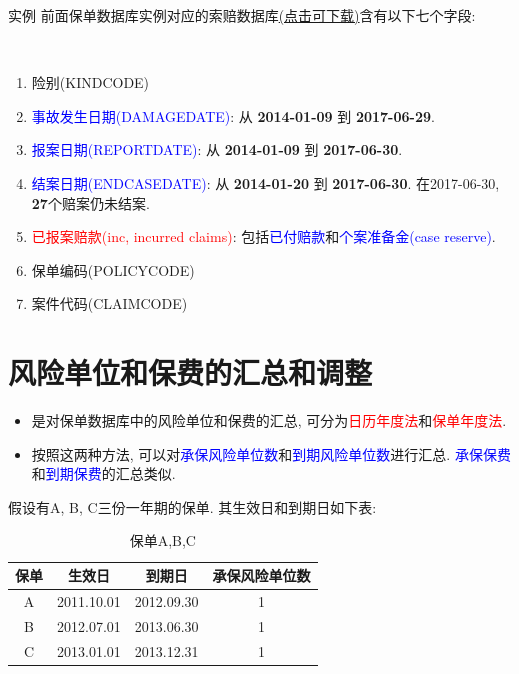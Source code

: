 \documentclass[professionalfont]{beamer}
\newcommand{\red}[1]{\textcolor{red}{#1}}
\newcommand{\green}[1]{\textbf{#1}}
\newcommand{\blue}[1]{\textcolor{blue}{#1}}
\begin{document}
\begin{frame}{实例}
前面保单数据库实例对应的索赔数据库\href{https://www.jianguoyun.com/p/Df-ykJgQyKLGBhjLsUU}{(点击可下载)}含有以下七个字段:
		
		~
		
		\begin{enumerate}
			\item 险别(KINDCODE)
			\item \blue{事故发生日期(DAMAGEDATE)}: 从 \green{2014-01-09} 到 \green{2017-06-29}.
			\item \blue{报案日期(REPORTDATE)}: 从 \green{2014-01-09} 到 \green{2017-06-30}.
			\item \blue{结案日期(ENDCASEDATE)}: 从 \green{2014-01-20} 到 \green{2017-06-30}. 在2017-06-30, \green{27}个赔案仍未结案.
			\item \red{已报案赔款(inc, incurred claims)}: 包括\blue{已付赔款}和\blue{个案准备金(case reserve)}.
			\item 保单编码(POLICYCODE)
			\item 案件代码(CLAIMCODE)
		\end{enumerate} 
	\end{frame}

\section{风险单位和保费的汇总和调整}
\begin{frame}
	\begin{itemize}
	\item 是对保单数据库中的风险单位和保费的汇总, 可分为\red{日历年度法}和\red{保单年度法}.
	
	\item 按照这两种方法, 可以对\blue{承保风险单位数}和\blue{到期风险单位数}进行汇总. \blue{承保保费}和\blue{到期保费}的汇总类似.
	\end{itemize}
\end{frame}
\begin{frame}
	假设有A, B, C三份一年期的保单. 其生效日和到期日如下表:
	\begin{table}[]
		\centering
		\caption{保单A,B,C}
		\label{my-label}
		\begin{tabular}{cccc}
			\hline
			保单 & 生效日        & 到期日        & 承保风险单位数 \\ \hline
			A  & 2011.10.01 & 2012.09.30 & 1       \\
			B  & 2012.07.01 & 2013.06.30 & 1       \\
			C  & 2013.01.01 & 2013.12.31 & 1       \\ \hline
		\end{tabular}
	\end{table}
\end{frame}
\end{document}
